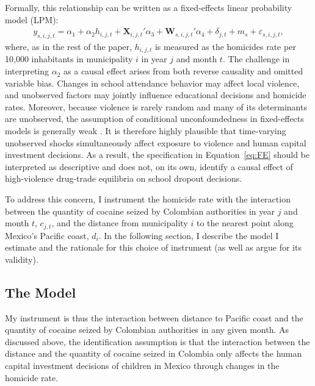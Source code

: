 \documentclass[12pt,letter,english,intoc,bibliography=totoc,index=totoc,BCOR10mm,captions=tableheading,nottitlepage,fleqn]{article}
\theoremstyle{break}
\begin{document}
Formally, this relationship can be written as a fixed-effects linear probability model (LPM):
\begin{equation}
\label{eq:FE}
\begin{aligned}
y_{s,i,j,t} = \alpha_1 + \alpha_2 h_{i,j,t} + \mathbf{X}_{i,j,t}'\alpha_3 + \mathbf{W}_{s,i,j,t}'\alpha_4 + \delta_{j,t} + m_s + \varepsilon_{s,i,j,t},
\end{aligned}
\end{equation}
where, as in the rest of the paper, $h_{i,j,t}$ is measured as the homicides rate per 10,000 inhabitants in municipality $i$ in year $j$ and month $t$. The challenge in interpreting $\alpha_2$ as a causal effect arises from both reverse causality and omitted variable bias. Changes in school attendance behavior may affect local violence, and unobserved factors may jointly influence educational decisions and homicide rates. Moreover, because violence is rarely random and many of its determinants are unobserved, the assumption of conditional unconfoundedness in fixed-effects models is generally weak \citep{bauer2016}. It is therefore highly plausible that time-varying unobserved shocks simultaneously affect exposure to violence and human capital investment decisions. As a result, the specification in Equation~\eqref{eq:FE} should be interpreted as descriptive and does not, on its own, identify a causal effect of high-violence drug-trade equilibria on school dropout decisions.

To address this concern, I instrument the homicide rate with the interaction between the quantity of cocaine seized by Colombian authorities in year $j$ and month $t$, $c_{j,t}$, and the distance from municipality $i$ to the nearest point along Mexico's Pacific coast, $d_i$. In the following section, I describe the model I estimate and the rationale for this choice of instrument (as well as argue for its validity).
\subsection{The Model}
My instrument is thus the interaction between distance to Pacific coast and the quantity of cocaine seized by Colombian authorities in any given month. As discussed above, the identification assumption is that the interaction between the distance and the quantity of cocaine seized in Colombia only affects the human capital investment decisions of children in Mexico through changes in the homicide rate. 
\end{document}
